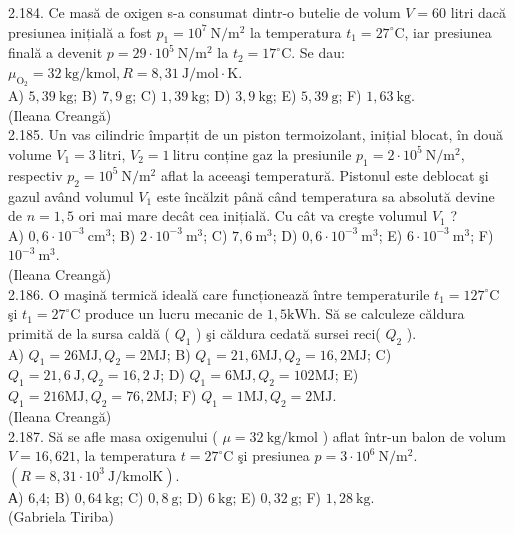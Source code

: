 2.184. Ce masă de oxigen s-a consumat dintr-o butelie de volum $V=60$ litri dacă presiunea inițială a fost $p_{1}=10^{7} \mathrm{~N} / \mathrm{m}^{2}$ la temperatura $t_{1}=27^{\circ} \mathrm{C}$, iar presiunea finală a devenit $p=29 \cdot 10^{5} \mathrm{~N} / \mathrm{m}^{2}$ la $t_{2}=17^{\circ} \mathrm{C}$. Se dau: $\mu_{\mathrm{O}_{2}}=32 \mathrm{~kg} / \mathrm{kmol}, R=8,31 \mathrm{~J} / \mathrm{mol} \cdot \mathrm{K}$.\\ A) $5,39 \mathrm{~kg}$; B) $7,9 \mathrm{~g}$; C) $1,39 \mathrm{~kg}$; D) $3,9 \mathrm{~kg}$; E) $5,39 \mathrm{~g}$; F) $1,63 \mathrm{~kg}$.\\ (Ileana Creangă)\\

2.185. Un vas cilindric împarțit de un piston termoizolant, inițial blocat, în două volume $V_{1}=3 \mathrm{~litri}$, $V_{2}=1 \mathrm{~litru}$ conține gaz la presiunile $p_{1}=2 \cdot 10^{5} \mathrm{~N} / \mathrm{m}^{2}$, respectiv $p_{2}=10^{5} \mathrm{~N} / \mathrm{m}^{2}$ aflat la aceeaşi temperatură. Pistonul este deblocat şi gazul având volumul $V_{1}$ este încălzit până când temperatura sa absolută devine de $n=1,5$ ori mai mare decât cea inițială. Cu cât va creşte volumul $V_{1}$ ?\\ A) $0,6 \cdot 10^{-3} \mathrm{~cm}^{3}$; B) $2 \cdot 10^{-3} \mathrm{~m}^{3}$; C) $7,6 \mathrm{~m}^{3}$; D) $0,6 \cdot 10^{-3} \mathrm{~m}^{3}$; E) $6 \cdot 10^{-3} \mathrm{~m}^{3}$; F) $10^{-3} \mathrm{~m}^{3}$.\\ (Ileana Creangă)\\

2.186. O maşină termică ideală care funcționează între temperaturile $t_{1}=127^{\circ} \mathrm{C}$ şi $t_{1}=27^{\circ} \mathrm{C}$ produce un lucru mecanic de $1,5 \mathrm{kWh}$. Să se calculeze căldura primită de la sursa caldă ( $Q_{1}$ ) şi căldura cedată sursei reci( $Q_{2}$ ).\\ A) $Q_{1}=26 \mathrm{MJ}, Q_{2}=2 \mathrm{MJ}$; B) $Q_{1}=21,6 \mathrm{MJ}, Q_{2}=16,2 \mathrm{MJ}$; C) $Q_{1}=21,6 \mathrm{~J}, Q_{2}=16,2 \mathrm{~J}$; D) $Q_{1}=6 \mathrm{MJ}, Q_{2}=102 \mathrm{MJ}$; E) $Q_{1}=216 \mathrm{MJ}, Q_{2}=76,2 \mathrm{MJ}$; F) $Q_{1}=1 \mathrm{MJ}, Q_{2}=2 \mathrm{MJ}$.\\ (Ileana Creangă)\\

2.187. Să se afle masa oxigenului ( $\mu=32 \mathrm{~kg} / \mathrm{kmol}$ ) aflat într-un balon de volum $V=16,621$, la temperatura $t=27^{\circ} \mathrm{C}$ şi presiunea $p=3 \cdot 10^{6} \mathrm{~N} / \mathrm{m}^{2}$. $\left(R=8,31 \cdot 10^{3} \mathrm{~J} / \mathrm{kmolK}\right)$.\\ А) 6,4; B) $0,64 \mathrm{~kg}$; C) $0,8 \mathrm{~g}$; D) $6 \mathrm{~kg}$; E) $0,32 \mathrm{~g}$; F) $1,28 \mathrm{~kg}$.\\ (Gabriela Tiriba)\\

